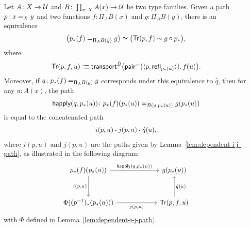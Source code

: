 \begin{thm}\fe\label{thm:dependent-function-equality-equivalence}
    Let\/ $A\colon X\to\univ$ and\/ $B\colon\prod_{x\colon X}A(x)\to\univ$ be two type families. Given a path $p\colon x\eq Xy$ and two functions\/ $f\colon\Pi_AB(x)$ and\/ $g\colon\Pi_AB(y)$, there is an equivalence
    \[
        \bigl(p_*(f)\mathrel{=_{\Pi_AB(y)}}g\bigr)
        \simeq
        \bigl(\mathsf{Tr}(p,f)\sim g\circ p_*\bigr),
    \]
    where
    \[
        \mathsf{Tr}(p,f,u)\mathrel{\vcentcolon}\equiv
            \mathsf{transport}^{\hat B}
            \bigl(
                \mathsf{pair}^{\mathrel{=_{}}}(\langle p,\mathsf{refl}_{p_*(u)}\rangle),
                f(u)
            \bigr).
    \]
    Moreover, if\/ $q\colon p_*(f)\eq{\Pi_AB(y)}g$ corresponds under this equivalence to\/ $\hat q$, then for any\/ $u\colon A(x)$, the path
    \[
        \fun{happly}(q,p_*(u))
        \colon p_*(f)(p_*(u))\eq{B(y,p_*(u))}g(p_*(u))
    \]
    is equal to the concatenated path
    \[
        i(p,u)\mathbin{\boldsymbol{\cdot}} j(p,u)\mathbin{\boldsymbol{\cdot}}\hat q(u),
    \]
    where\/ $i(p,u)$ and $j(p,u)$ are the paths given by\/ {\upshape Lemma~\ref{lem:dependent-i-j-path}}, as illustrated in the following diagram:
    \[
        \begin{tikzcd}[column sep=6em, row sep=3em]
            p_*(f)(p_*(u))
                    \arrow[r,"{\fun{happly}(q, p_*(u))}"]
                    \arrow[d,"{i(p,u)}"']
                &g(p_*(u))\\
            \Phi((p^{-1})_*(p_*(u)))
                    \arrow[r,"{j(p,u)}"']
            &\fun{Tr}(p,f,u)
                    \arrow[u,"\hat q(u)"']
        \end{tikzcd}
    \]
    with $\Phi$ defined in\/ {\upshape Lemma~\ref{lem:dependent-i-j-path}}.
\end{thm}

